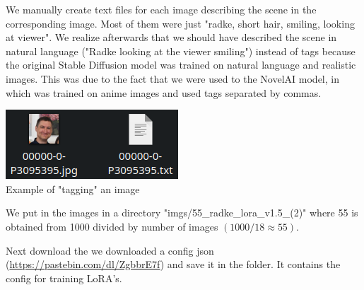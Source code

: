 \documentclass{article}
\begin{document}
We manually create text files for each image describing the scene in the corresponding image. Most of them were just "radke, short hair, smiling, looking at viewer". We realize afterwards that we should have described the scene in natural language ("Radke looking at the viewer smiling") instead of tags because the original Stable Diffusion model was trained on natural language and realistic images. This was due to the fact that we were used to the NovelAI model, in which was trained on anime images and used tags separated by commas.
\begin{center}
    \includegraphics[scale=1.0]{.imgs/other/tagging.png} \\
    Example of "tagging" an image
\end{center}

We put in the images in a directory "imgs/55\_radke\_lora\_v1.5\_(2)" where 55 is obtained from 1000 divided by number of images $(1000/18\approx 55)$.

\newpage
Next download the we downloaded a config json (\href{https://pastebin.com/dl/ZgbbrE7f}{https://pastebin.com/dl/ZgbbrE7f}) and save it in the folder. It contains the config for training LoRA's.
\end{document}
